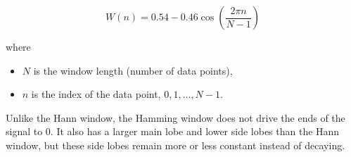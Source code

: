 \begin{center}
\end{center}

\begin{equation*}
    W(n) = 0.54 - 0.46 \cos\left(\frac{2\pi n}{N-1}\right)
\end{equation*}

where

\begin{itemize}
    \item $N$ is the window length (number of data points),
    \item $n$ is the index of the data point, $0, 1, \dots, N-1$.
\end{itemize}

Unlike the Hann window, the Hamming window does not drive the ends of the signal to 0. It also has a larger main lobe and lower side lobes than the Hann window, but these side lobes remain more or less constant instead of decaying.